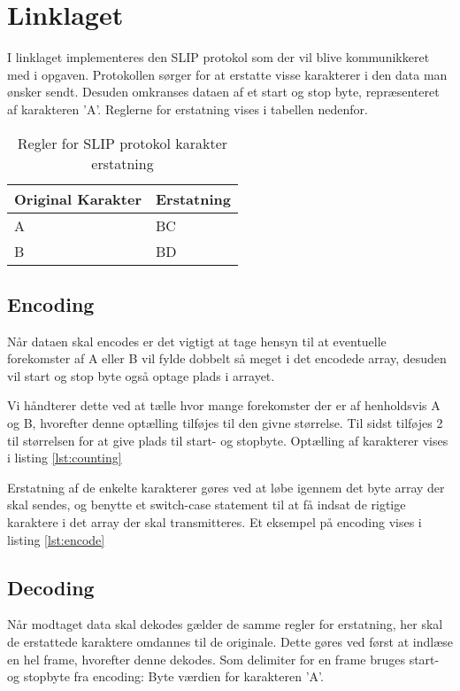\chapter{Linklaget}
I linklaget implementeres den SLIP protokol som der vil blive kommunikkeret med i opgaven. Protokollen sørger for at erstatte visse karakterer i den data man ønsker sendt. Desuden omkranses dataen af et start og stop byte, repræsenteret af karakteren 'A'. Reglerne for erstatning vises i tabellen nedenfor.

\vspace{0.3cm}
\begin{table}[H]
	\centering
	\begin{tabular}{| l | l |}
		\hline
		\textbf{Original Karakter} & \textbf{Erstatning} \\ \hline
		A & BC \\ \hline
		B & BD \\
		\hline
	\end{tabular}
	\caption{Regler for SLIP protokol karakter erstatning}	
\end{table}

\section{Encoding}\label{sec:encoding}
Når dataen skal encodes er det vigtigt at tage hensyn til at eventuelle forekomster af A eller B vil fylde dobbelt så meget i det encodede array, desuden vil start og stop byte også optage plads i arrayet.

Vi håndterer dette ved at tælle hvor mange forekomster der er af henholdsvis A og B, hvorefter denne optælling tilføjes til den givne størrelse. Til sidst tilføjes 2 til størrelsen for at give plads til start- og stopbyte. Optælling af karakterer vises i listing \ref{lst:counting}



Erstatning af de enkelte karakterer gøres ved at løbe igennem det byte array der skal sendes, og benytte et switch-case statement til at få indsat de rigtige karaktere i det array der skal transmitteres. Et eksempel på encoding vises i listing \ref{lst:encode}



\section{Decoding}
Når modtaget data skal dekodes gælder de samme regler for erstatning, her skal de erstattede karaktere omdannes til de originale. Dette gøres ved først at indlæse en hel frame, hvorefter denne dekodes. Som delimiter for en frame bruges start- og stopbyte fra encoding: Byte værdien for karakteren 'A'.

